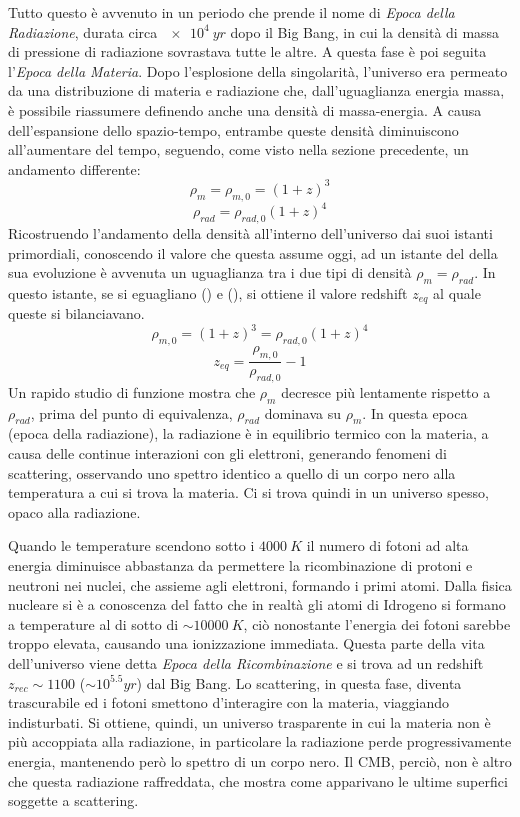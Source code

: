 Tutto questo è avvenuto in un periodo che prende il nome di \textit{Epoca della Radiazione}, durata circa $\SI{e4}{yr}$ dopo il Big Bang, in cui la densità di massa di pressione di radiazione sovrastava tutte le altre. A questa fase è poi seguita l'\textit{Epoca della Materia}. Dopo l'esplosione della singolarità, l'universo era permeato da una distribuzione di materia e radiazione che, dall'uguaglianza energia massa, è possibile riassumere definendo anche una densità di massa-energia. A causa dell'espansione dello spazio-tempo, entrambe queste densità diminuiscono all'aumentare del tempo, seguendo, come visto nella sezione precedente, un andamento differente:
\begin{equation}\label{eq:densita-massa}
    \rho_m = \rho_{m,0} = {(1+z)}^3
\end{equation}
\begin{equation}\label{eq:densita-radiazione}
    \rho_{rad}=\rho_{rad, 0} {(1+z)}^4
\end{equation}
Ricostruendo l'andamento della densità all'interno dell'universo dai suoi istanti primordiali, conoscendo il valore che questa assume oggi, ad un istante del della sua evoluzione è avvenuta un uguaglianza tra i due tipi di densità $\rho_m = \rho_{rad}$. In questo istante, se si eguagliano () e (), si ottiene il valore redshift $z_{eq}$ al quale queste si bilanciavano.
\[
    \rho_{m,0} = {(1+z)}^3 = \rho_{rad, 0} {(1+z)}^4
\]
\[
    z_{eq} = \frac{\rho_{m,0}}{\rho_{rad, 0}} - 1
\]
Un rapido studio di funzione mostra che $\rho_m$ decresce più lentamente rispetto a $\rho_{rad}$, prima del punto di equivalenza, $\rho_{rad}$ dominava su $\rho_{m}$. In questa epoca (epoca della radiazione), la radiazione è in equilibrio termico con la materia, a causa delle continue interazioni con gli elettroni, generando fenomeni di scattering, osservando uno spettro identico a quello di un corpo nero alla temperatura a cui si trova la materia. Ci si trova quindi in un universo spesso, opaco alla radiazione.

Quando le temperature scendono sotto i $\SI{4000}{K}$ il numero di fotoni ad alta energia diminuisce abbastanza da permettere la ricombinazione di protoni e neutroni nei nuclei, che assieme agli elettroni, formando i primi atomi. Dalla fisica nucleare si è a conoscenza del fatto che in realtà gli atomi di Idrogeno si formano a temperature al di sotto di $\sim \SI{10000}{K}$, ciò nonostante l'energia dei fotoni sarebbe troppo elevata, causando una ionizzazione immediata. Questa parte della vita dell'universo viene detta \textit{Epoca della Ricombinazione} e si trova ad un redshift $z_{rec} \sim 1100$ ($\sim 10^{5.5} \si{yr}$) dal Big Bang. Lo scattering, in questa fase, diventa trascurabile ed i fotoni smettono d'interagire con la materia, viaggiando indisturbati. Si ottiene, quindi, un universo trasparente in cui la materia non è più accoppiata alla radiazione, in particolare la radiazione perde progressivamente energia, mantenendo però lo spettro di un corpo nero. Il CMB, perciò, non è altro che questa radiazione raffreddata, che mostra come apparivano le ultime superfici soggette a scattering.

